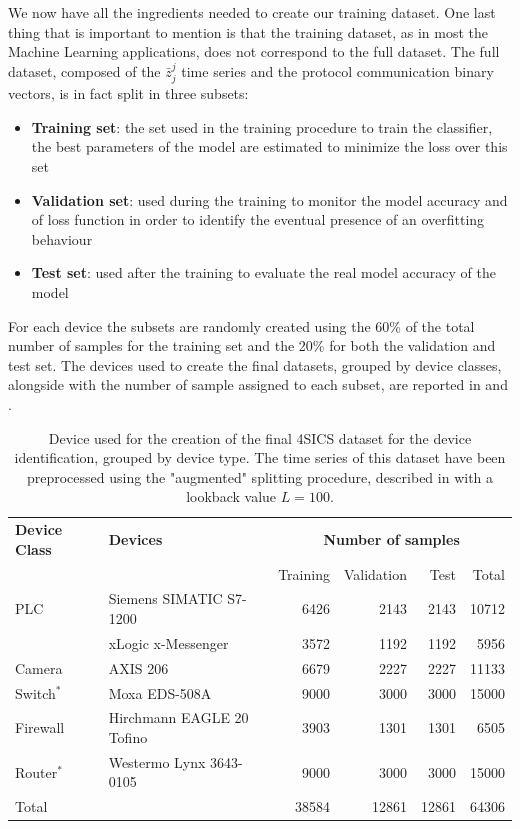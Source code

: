 We now have all the ingredients needed to create our training dataset. One last thing that is important to mention is that the training dataset, as in most the Machine Learning applications,
does not correspond to the full dataset. The full dataset, composed of the $\bar{z}_j^j$ time series and the protocol communication binary vectors, is in fact split in three subsets:
\begin{itemize}[noitemsep, nolistsep]
    \item \textbf{Training set}: the set used in the training procedure to train the classifier, the best parameters of the model are estimated to minimize the loss over this set
    \item \textbf{Validation set}: used during the training to monitor the model accuracy and of  loss function in order to identify the eventual presence of an overfitting behaviour 
    \item \textbf{Test set}: used after the training to evaluate the real model accuracy of the model
\end{itemize}
For each device the subsets are randomly created using the 60\% of the total number of samples for the training set and the 20\% for both the validation and test set.
The devices used to create the final datasets, grouped by device classes, alongside with the number of sample assigned to each subset, are reported in  and .




\begin{table}[h]
\centering
\begin{tabular}{llrrrr}
\toprule
\textbf{Device Class} & \textbf{Devices} & \multicolumn{4}{c}{\textbf{Number of samples}} \\
& & Training & Validation & Test & Total \\
\midrule
\multirow{1}{*}{PLC} & Siemens SIMATIC S7-1200 & 6426 & 2143 & 2143 & 10712  \\
                     & xLogic x-Messenger & 3572 & 1192 & 1192 & 5956  \\
\midrule
\multirow{1}{*}{Camera}  & AXIS 206 & 6679 & 2227 & 2227 & 11133 \\
\midrule
\multirow{1}{*}{Switch$^*$} & Moxa EDS-508A  & 9000 & 3000 & 3000 & 15000 \\
\midrule
\multirow{1}{*}{Firewall}& Hirchmann EAGLE 20 Tofino & 3903 & 1301 & 1301 & 6505 \\
\midrule
\multirow{1}{*}{Router$^*$} & Westermo Lynx 3643-0105  & 9000 & 3000 & 3000 & 15000  \\ 
\midrule
\midrule
Total & & 38584 & 12861 & 12861 & 64306 \\
\bottomrule
\end{tabular}
\caption{Device used for the creation of the final 4SICS dataset for the device identification, grouped by device type. The time series of this dataset have been preprocessed using the "augmented" splitting procedure, described in  with a lookback value $L=100$.}
\label{tab:4sicsdev}
\end{table}



